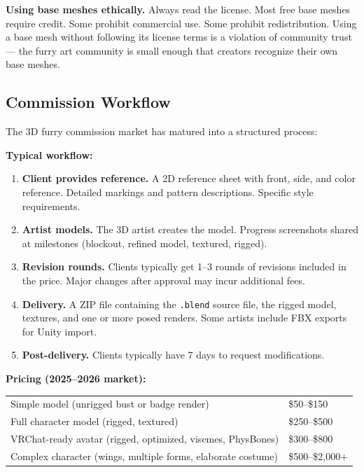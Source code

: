 \begin{warningbox}
\textbf{Using base meshes ethically.} Always read the license. Most free base meshes require credit. Some prohibit commercial use. Some prohibit redistribution. Using a base mesh without following its license terms is a violation of community trust --- the furry art community is small enough that creators recognize their own base meshes.
\end{warningbox}


\subsection{Commission Workflow}

The 3D furry commission market has matured into a structured process:

\textbf{Typical workflow:}

\begin{enumerate}[leftmargin=2em]
  \item \textbf{Client provides reference.} A 2D reference sheet with front, side, and color reference. Detailed markings and pattern descriptions. Specific style requirements.
  \item \textbf{Artist models.} The 3D artist creates the model. Progress screenshots shared at milestones (blockout, refined model, textured, rigged).
  \item \textbf{Revision rounds.} Clients typically get 1--3 rounds of revisions included in the price. Major changes after approval may incur additional fees.
  \item \textbf{Delivery.} A ZIP file containing the \texttt{.blend} source file, the rigged model, textures, and one or more posed renders. Some artists include FBX exports for Unity import.
  \item \textbf{Post-delivery.} Clients typically have 7 days to request modifications.
\end{enumerate}

\textbf{Pricing (2025--2026 market):}

\begin{center}
\begin{tabularx}{\textwidth}{L{5.5cm}X}
\toprule
{}
 &  \\
\midrule
Simple model (unrigged bust or badge render) & \$50--\$150 \\
Full character model (rigged, textured) & \$250--\$500 \\
VRChat-ready avatar (rigged, optimized, visemes, PhysBones) & \$300--\$800 \\
Complex character (wings, multiple forms, elaborate costume) & \$500--\$2,000+ \\
\bottomrule
\end{tabularx}
\end{center}

